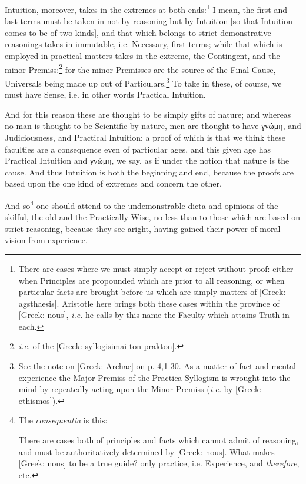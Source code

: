 Intuition, moreover, takes in the extremes at both ends:\footnote{There are cases where we must simply accept or reject without proof: either
when Principles are propounded which are prior to all reasoning, or when
particular facts are brought before us which are simply matters of [Greek:
agsthaesis]. Aristotle here brings both these cases within the province of
[Greek: nous], \emph{i.e.} he calls by this name the Faculty which attains
Truth in each.}
I mean, the first and last terms must be taken in not by reasoning but by
Intuition [so that Intuition comes to be of two kinds], and that which belongs
to strict demonstrative reasonings takes in immutable, i.e. Necessary, first
terms; while that which is employed in practical matters takes in the extreme,
the Contingent, and the minor Premiss:\footnote{\emph{i.e.} of the [Greek: syllogisimai ton prakton].}
for the minor Premisses are the source of the Final Cause, Universals being
made up out of Particulars.\footnote{See the note on [Greek: Archae] on p. 4,1 30. As a matter of fact and mental
experience the Major Premiss of the Practica Syllogism is wrought into the mind
by repeatedly acting upon the Minor Premiss (\emph{i.e.} by [Greek: ethismos]).}
To take in these, of course, we must have Sense, i.e. in other words Practical
Intuition.

And for this reason these are thought to be simply gifts of nature; and whereas
no man is thought to be Scientific by nature, men are thought to have
γνώμη, and Judiciousness, and Practical Intuition: a
proof of which is that we think these faculties are a consequence even of
particular ages, and this given age has Practical Intuition and
γνώμη, we say, as if under the notion that nature is
the cause. And thus Intuition is both the beginning and end, because the proofs
are based upon the one kind of extremes and concern the other.

And so\footnote{The \emph{consequentia} is this:

There are cases both of principles and facts which cannot admit of
reasoning, and must be authoritatively determined by [Greek: nous]. What makes
[Greek: nous] to be a true guide? only practice, i.e. Experience, and
\emph{therefore}, etc.}
one should attend to the undemonstrable dicta and opinions of the skilful, the
old and the Practically-Wise, no less than to those which are based on strict
reasoning, because they see aright, having gained their power of moral vision
from experience.


